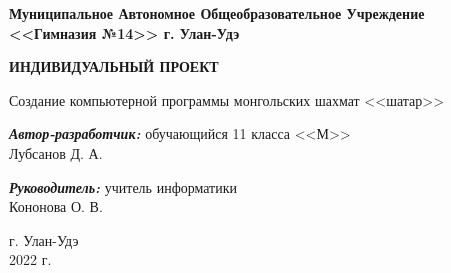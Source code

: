 \begin{titlepage}
	\begin{center}
		\textbf{ 
			Муниципальное Автономное Общеобразовательное Учреждение \\
			<<Гимназия №14>> г. Улан-Удэ
		}
		
		\vspace{4em}
		\textbf{
			ИНДИВИДУАЛЬНЫЙ ПРОЕКТ
		}
		\vspace{6em}
		
		Создание компьютерной программы монгольских шахмат <<шатар>>
		
	\end{center}
	\vspace{8em}
	\begin{flushright}
		
		\textbf{\textit{Автор-разработчик:}}
		обучающийся 11 класса <<М>> \\
		Лубсанов Д. А.
		
		\vspace{2em}
		
		\textbf{\textit{Руководитель:}}
		учитель информатики \\
		Кононова О. В.
		
	\end{flushright}
	
	\vspace{14em}
	
	\begin{center}
		г. Улан-Удэ \\
		2022 г.
	\end{center}
	
	\clearpage
\end{titlepage}